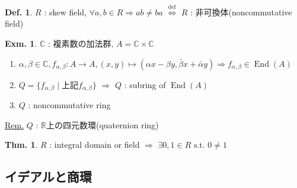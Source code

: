 \documentclass[uplatex,dvipdfmx,9pt]{beamer}
\newcommand{\defarrow}{\overset{\mathrm{def}}{\Leftrightarrow}}
\newcommand{\st}{\text{ s.t. }}
\newcommand{\End}[1]{\operatorname{End}(#1)}
\newcommand{\R}{\mathbb{R}}
\newcommand{\C}{\mathbb{C}}
\newcommand{\sscount}{\textsection \thesubsection}
\newcounter{textExmCount}
\theoremstyle{definition} %
\newtheorem{defn}{Def.}[subsection] %
\newtheorem{thm}{Thm.}[subsection] %
\theoremstyle{example}
\newtheorem{exmText}[textExmCount]{Exm.}
\begin{document}
    \begin{frame}

      \begin{defn}
        $R$ : skew field, $\forall a,b \in R \Rightarrow ab \neq ba$ $\defarrow$ $R$ : \alert{非可換体(noncommutative field)}
      \end{defn}

      \begin{exmText}
        $\C$ : 複素数の加法群, $A = \C \times \C$
        \begin{enumerate}
          \item $\alpha, \beta \in \C, f_{\alpha, \beta}\colon A \to A, (x,y) \mapsto (\alpha x - \beta y, \bar{\beta} x + \bar{\alpha} y) \Rightarrow f_{\alpha, \beta} \in \End{A}$
          \item $Q = \{f_{\alpha, \beta} \mid \text{上記$f_{\alpha, \beta}$}\}$ $\Rightarrow$ $Q$ : subring of $\End{A}$
          \item $Q$ : noncommutative ring
        \end{enumerate}
      \end{exmText}
      \underline{Rem.} $Q$ : $\R$上の\alert{四元数環(quaternion ring)}

      \begin{thm}
        $R$ : integral domain or field $\Rightarrow$ $\exists 0, 1 \in R \st 0 \neq 1$
      \end{thm}
      
    \end{frame}

    \subsection{\sscount イデアルと商環}
    \setcounter{textExmCount}{0}
\end{document}
